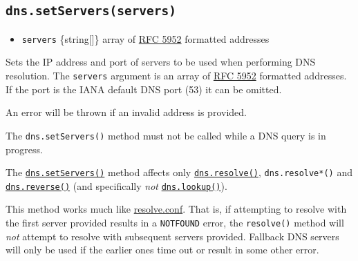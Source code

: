 \subsection{\texorpdfstring{\texttt{dns.setServers(servers)}}{dns.setServers(servers)}}\label{dns.setserversservers}

\begin{itemize}
\tightlist
\item
  \texttt{servers} \{string{[}{]}\} array of
  \href{https://tools.ietf.org/html/rfc5952\#section-6}{RFC 5952}
  formatted addresses
\end{itemize}

Sets the IP address and port of servers to be used when performing DNS
resolution. The \texttt{servers} argument is an array of
\href{https://tools.ietf.org/html/rfc5952\#section-6}{RFC 5952}
formatted addresses. If the port is the IANA default DNS port (53) it
can be omitted.

\begin{Shaded}
\begin{Highlighting}[]
\NormalTok{([}
  \OperatorTok{,}
  \StringTok{\textquotesingle{}[2001:4860:4860::8888]\textquotesingle{}}\OperatorTok{,}
  \OperatorTok{,}
  \StringTok{\textquotesingle{}[2001:4860:4860::8888]:1053\textquotesingle{}}\OperatorTok{,}
\NormalTok{])}\OperatorTok{;}
\end{Highlighting}
\end{Shaded}

An error will be thrown if an invalid address is provided.

The \texttt{dns.setServers()} method must not be called while a DNS
query is in progress.

The \hyperref[dnssetserversservers]{\texttt{dns.setServers()}} method
affects only
\hyperref[dnsresolvehostname-rrtype-callback]{\texttt{dns.resolve()}},
\texttt{dns.resolve*()} and
\hyperref[dnsreverseip-callback]{\texttt{dns.reverse()}} (and
specifically \emph{not}
\hyperref[dnslookuphostname-options-callback]{\texttt{dns.lookup()}}).

This method works much like
\href{https://man7.org/linux/man-pages/man5/resolv.conf.5.html}{resolve.conf}.
That is, if attempting to resolve with the first server provided results
in a \texttt{NOTFOUND} error, the \texttt{resolve()} method will
\emph{not} attempt to resolve with subsequent servers provided. Fallback
DNS servers will only be used if the earlier ones time out or result in
some other error.

